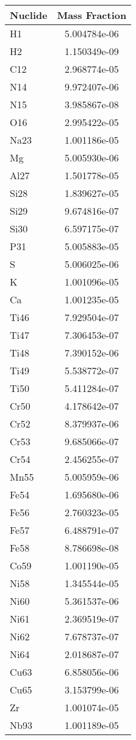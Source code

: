 \begin{centering}
\begin{table}[ht!]
\begin{tabular}{l | c}
\hline
Nuclide & Mass Fraction\\
\hline
H1 & 5.004784e-06\\
H2 & 1.150349e-09\\
C12 & 2.968774e-05\\
N14 & 9.972407e-06\\
N15 & 3.985867e-08\\
O16 & 2.995422e-05\\
Na23 & 1.001186e-05\\
Mg & 5.005930e-06\\
Al27 & 1.501778e-05\\
Si28 & 1.839627e-05\\
Si29 & 9.674816e-07\\
Si30 & 6.597175e-07\\
P31 & 5.005883e-05\\
S & 5.006025e-06\\
K & 1.001096e-05\\
Ca & 1.001235e-05\\
Ti46 & 7.929504e-07\\
Ti47 & 7.306453e-07\\
Ti48 & 7.390152e-06\\
Ti49 & 5.538772e-07\\
Ti50 & 5.411284e-07\\
Cr50 & 4.178642e-07\\
Cr52 & 8.379937e-06\\
Cr53 & 9.685066e-07\\
Cr54 & 2.456255e-07\\
Mn55 & 5.005959e-06\\
Fe54 & 1.695680e-06\\
Fe56 & 2.760323e-05\\
Fe57 & 6.488791e-07\\
Fe58 & 8.786698e-08\\
Co59 & 1.001190e-05\\
Ni58 & 1.345544e-05\\
Ni60 & 5.361537e-06\\
Ni61 & 2.369519e-07\\
Ni62 & 7.678737e-07\\
Ni64 & 2.018687e-07\\
Cu63 & 6.858056e-06\\
Cu65 & 3.153799e-06\\
Zr & 1.001074e-05\\
Nb93 & 1.001189e-05\\

\end{tabular}
\end{table}
\end{centering}
